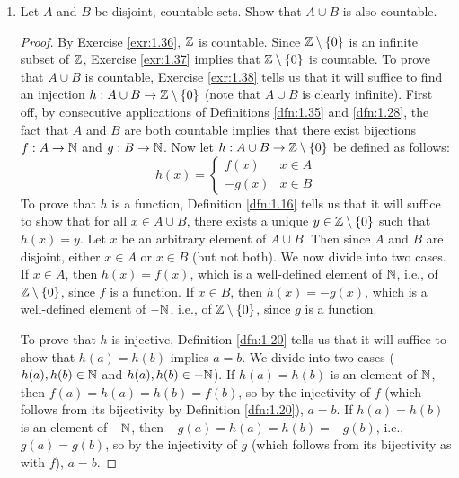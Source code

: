 \documentclass[../main.tex]{subfiles}
\begin{document}
\begin{enumerate}
\begin{proof}[Proof of b]
        Now suppose that $A=\inte(A)$. Then since $\inte(A)$ is open by part (a), clearly $A$ is open, too.
    \end{proof}
    \item Let $A$ and $B$ be disjoint, countable sets. Show that $A\cup B$ is also countable.
    \begin{proof}
        By Exercise \ref{exr:1.36}, $\mathbb{Z}$ is countable. Since $\mathbb{Z}\setminus\{0\}$ is an infinite subset of $\mathbb{Z}$, Exercise \ref{exr:1.37} implies that $\mathbb{Z}\setminus\{0\}$ is countable. To prove that $A\cup B$ is countable, Exercise \ref{exr:1.38} tells us that it will suffice to find an injection $h:A\cup B\to\mathbb{Z}\setminus\{0\}$ (note that $A\cup B$ is clearly infinite). First off, by consecutive applications of Definitions \ref{dfn:1.35} and \ref{dfn:1.28}, the fact that $A$ and $B$ are both countable implies that there exist bijections $f:A\to\mathbb{N}$ and $g:B\to\mathbb{N}$. Now let $h:A\cup B\to\mathbb{Z}\setminus\{0\}$ be defined as follows:
        \begin{equation*}
            h(x) =
            \begin{cases}
                f(x) & x\in A\\
                -g(x) & x\in B
            \end{cases}
        \end{equation*}
        To prove that $h$ is a function, Definition \ref{dfn:1.16} tells us that it will suffice to show that for all $x\in A\cup B$, there exists a unique $y\in\mathbb{Z}\setminus\{0\}$ such that $h(x)=y$. Let $x$ be an arbitrary element of $A\cup B$. Then since $A$ and $B$ are disjoint, either $x\in A$ or $x\in B$ (but not both). We now divide into two cases. If $x\in A$, then $h(x)=f(x)$, which is a well-defined element of $\mathbb{N}$, i.e., of $\mathbb{Z}\setminus\{0\}$, since $f$ is a function. If $x\in B$, then $h(x)=-g(x)$, which is a well-defined element of $-\mathbb{N}$, i.e., of $\mathbb{Z}\setminus\{0\}$, since $g$ is a function.\par
        To prove that $h$ is injective, Definition \ref{dfn:1.20} tells us that it will suffice to show that $h(a)=h(b)$ implies $a=b$. We divide into two cases ($h(a),h(b)\in\mathbb{N}$ and $h(a),h(b)\in-\mathbb{N}$). If $h(a)=h(b)$ is an element of $\mathbb{N}$, then $f(a)=h(a)=h(b)=f(b)$, so by the injectivity of $f$ (which follows from its bijectivity by Definition \ref{dfn:1.20}), $a=b$. If $h(a)=h(b)$ is an element of $-\mathbb{N}$, then $-g(a)=h(a)=h(b)=-g(b)$, i.e., $g(a)=g(b)$, so by the injectivity of $g$ (which follows from its bijectivity as with $f$), $a=b$.
    \end{proof}

\end{enumerate}
\end{document}
